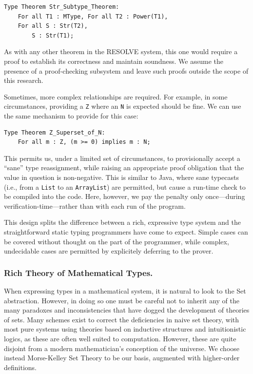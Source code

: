 \begin{lstlisting}
Type Theorem Str_Subtype_Theorem:
	For all T1 : MType, For all T2 : Power(T1),
	For all S : Str(T2),
		S : Str(T1);
\end{lstlisting}

As with any other theorem in the RESOLVE system, this one would require a proof to establish its correctness and maintain soundness.  We assume the presence of a proof-checking subsystem and leave such proofs outside the scope of this research.

Sometimes, more complex relationships are required.  For example, in some circumstances, providing a \texttt{Z} where an \texttt{N} is expected should be fine.  We can use the same mechanism to provide for this case:

\begin{lstlisting}
Type Theorem Z_Superset_of_N:
	For all m : Z, (m >= 0) implies m : N;
\end{lstlisting}

This permits us, under a limited set of circumstances, to provisionally accept a ``sane'' type reassignment, while raising an appropriate proof obligation that the value in question is non-negative.  This is similar to Java, where sane typecasts (i.e., from a \texttt{List} to an \texttt{ArrayList}) are permitted, but cause a run-time check to be compiled into the code.  Here, however, we pay the penalty only once---during verification-time---rather than with each run of the program.

This design splits the difference between a rich, expressive type system and the straightforward static typing programmers have come to expect.  Simple cases can be covered without thought on the part of the programmer, while complex, undecidable cases are permitted by explicitely deferring to the prover.

\subsubsection{Rich Theory of Mathematical Types.}\label{subsubsect:richSetTheory}
When expressing types in a mathematical system, it is natural to look to the Set abstraction.  However, in doing so one must be careful not to inherit any of the many paradoxes and inconsistencies that have dogged the development of theories of sets.  Many schemes exist to correct the deficiencies in naive set theory, with most pure systems using theories based on inductive structures and intuitionistic logics, as these are often well suited to computation.  However, these are quite disjoint from a modern mathematician's conception of the universe.  We choose instead Morse-Kelley Set Theory to be our basis, augmented with higher-order definitions.

